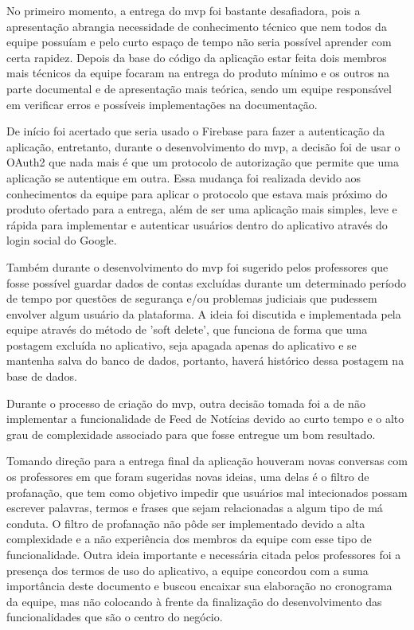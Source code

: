 No primeiro momento, a entrega do \ac{mvp} foi bastante desafiadora, pois a apresentação abrangia necessidade de conhecimento técnico que nem todos da equipe possuíam e pelo curto espaço de tempo não seria possível aprender com certa rapidez. Depois da base do código da aplicação estar feita dois membros mais técnicos da equipe focaram na entrega do produto mínimo e os outros na parte documental e de apresentação mais teórica, sendo um equipe responsável em verificar erros e possíveis implementações na documentação.

De início foi acertado que seria usado o Firebase para fazer a autenticação da aplicação, entretanto, durante o desenvolvimento do \ac{mvp}, a decisão foi de usar o OAuth2 que nada mais é que um protocolo de autorização que permite que uma aplicação se autentique em outra. Essa mudança foi realizada devido aos conhecimentos da equipe para aplicar o protocolo que estava mais próximo do produto ofertado para a entrega, além de ser uma aplicação mais simples, leve e rápida para implementar e autenticar usuários dentro do aplicativo através do login social do Google. 

Também durante o desenvolvimento do \ac{mvp} foi sugerido pelos professores que fosse possível guardar dados de contas excluídas durante um determinado período de tempo por questões de segurança e/ou problemas judiciais que pudessem envolver algum usuário da plataforma. A ideia foi discutida e implementada pela equipe através do método de 'soft delete', que funciona de forma que uma postagem excluída no aplicativo, seja apagada apenas do aplicativo e se mantenha salva do banco de dados, portanto, haverá histórico dessa postagem na base de dados.

Durante o processo de criação do \ac{mvp}, outra decisão tomada foi a de não implementar a funcionalidade de Feed de Notícias devido ao curto tempo e o alto grau de complexidade associado para que fosse entregue um bom resultado.

Tomando direção para a entrega final da aplicação houveram novas conversas com os professores em que foram sugeridas novas ideias, uma delas é o filtro de profanação, que tem como objetivo impedir que usuários mal intecionados possam escrever palavras, termos e frases que sejam relacionadas a algum tipo de má conduta. O filtro de profanação não pôde ser implementado devido a alta complexidade e a não experiência dos membros da equipe com esse tipo de funcionalidade. Outra ideia importante e necessária citada pelos professores foi a presença dos termos de uso do aplicativo, a equipe concordou com a suma importância deste documento e buscou encaixar sua elaboração no cronograma da equipe, mas não colocando à frente da finalização do desenvolvimento das funcionalidades que são o centro do negócio. 

